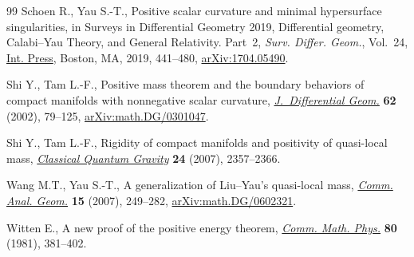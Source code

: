 \documentclass[10pt,a4paper]{amsart}
\numberwithin{equation}{section}
\begin{document}
\begin{thebibliography}{99}
Schoen R., Yau S.-T., Positive scalar curvature and minimal hypersurface
 singularities, in Surveys in Differential Geometry 2019, {D}ifferential
 geometry, {C}alabi--{Y}au Theory, and General Relativity. {P}art~2,
 \textit{Surv. Differ. Geom.}, Vol.~24, \href{https://dx.doi.org/10.4310/SDG.2019.v24.n1.a10}{Int. Press}, Boston, MA, 2019,
 441--480, \href{https://arxiv.org/abs/1704.05490}{arXiv:1704.05490}.

Shi Y., Tam L.-F., Positive mass theorem and the boundary behaviors of compact
 manifolds with nonnegative scalar curvature, \href{https://doi.org/10.4310/jdg/1090425530}{\textit{J.~Differential Geom.}}
 \textbf{62} (2002), 79--125, \href{https://arxiv.org/abs/math.DG/0301047}{arXiv:math.DG/0301047}.

Shi Y., Tam L.-F., Rigidity of compact manifolds and positivity of quasi-local
 mass, \href{https://doi.org/10.1088/0264-9381/24/9/013}{\textit{Classical Quantum Gravity}} \textbf{24} (2007), 2357--2366.

Wang M.T., Yau S.-T., A generalization of {L}iu--{Y}au's quasi-local mass,
 \href{https://dx.doi.org/10.4310/CAG.2007.v15.n2.a2}{\textit{Comm. Anal. Geom.}} \textbf{15} (2007), 249--282,
 \href{https://arxiv.org/abs/math.DG/0602321}{arXiv:math.DG/0602321}.

Witten E., A new proof of the positive energy theorem, \href{https://doi.org/10.1007/BF01208277}{\textit{Comm. Math.
 Phys.}} \textbf{80} (1981), 381--402.

\end{thebibliography}
\end{document}
